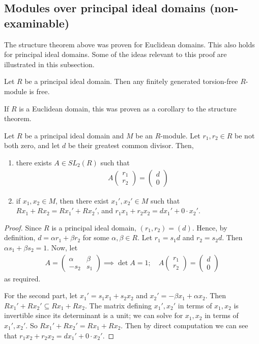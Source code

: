 \subsection{Modules over principal ideal domains (non-examinable)}
The structure theorem above was proven for Euclidean domains.
This also holds for principal ideal domains.
Some of the ideas relevant to this proof are illustrated in this subsection.
\begin{theorem}
	Let $R$ be a principal ideal domain.
	Then any finitely generated torsion-free $R$-module is free.
\end{theorem}
If $R$ is a Euclidean domain, this was proven as a corollary to the structure theorem.
\begin{lemma}
	Let $R$ be a principal ideal domain and $M$ be an $R$-module.
	Let $r_1, r_2 \in R$ be not both zero, and let $d$ be their greatest common divisor.
	Then,
	\begin{enumerate}
		\item there exists $A \in SL_2(R)$ such that
		      \begin{align*}
			      A \begin{pmatrix}
				      r_1 \\
				      r_2
			      \end{pmatrix} = \begin{pmatrix}
				      d \\
				      0
			      \end{pmatrix}
		      \end{align*}
		\item if $x_1, x_2 \in M$, then there exist $x_1', x_2' \in M$ such that $Rx_1 + Rx_2 = Rx_1' + Rx_2'$, and $r_1 x_1 + r_2 x_2  = d x_1' + 0 \cdot x_2'$.
	\end{enumerate}
\end{lemma}
\begin{proof}
	Since $R$ is a principal ideal domain, $(r_1, r_2) = (d)$.
	Hence, by definition, $d = \alpha r_1 + \beta r_2$ for some $\alpha, \beta \in R$.
	Let $r_1 = s_1 d$ and $r_2 = s_2 d$.
	Then $\alpha s_1 + \beta s_2 = 1$.
	Now, let
	\begin{align*}
		A = \begin{pmatrix}
			\alpha & \beta \\
			-s_2   & s_1
		\end{pmatrix} \implies \det A = 1;\quad A \begin{pmatrix}
			r_1 \\
			r_2
		\end{pmatrix} = \begin{pmatrix}
			d \\
			0
		\end{pmatrix}
	\end{align*}
	as required.

	For the second part, let $x_1' = s_1 x_1 + s_2 x_2$ and $x_2' = -\beta x_1 + \alpha x_2$.
	Then $Rx_1' + Rx_2' \subseteq Rx_1 + Rx_2$.
	The matrix defining $x_1', x_2'$ in terms of $x_1, x_2$ is invertible since its determinant is a unit; we can solve for $x_1, x_2$ in terms of $x_1', x_2'$.
	So $Rx_1' + Rx_2' = Rx_1 + Rx_2$.
	Then by direct computation we can see that $r_1 x_2 + r_2 x_2 = d x_1' + 0 \cdot x_2'$.
\end{proof}
